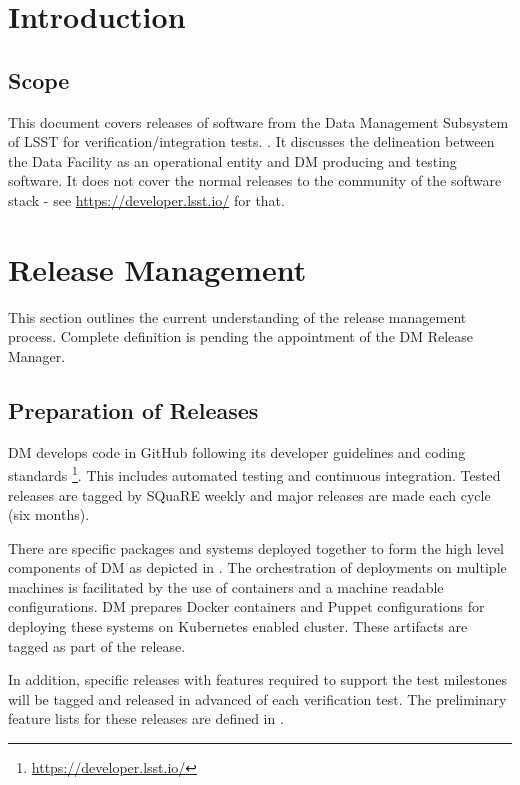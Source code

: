 \section{Introduction}
\subsection{Scope}

This document covers releases of software from the Data Management Subsystem of LSST for verification/integration tests. .
It discusses the delineation between the Data Facility as an operational entity and DM producing and testing software.
It does not cover the normal releases to the community of the software stack - see \url{https://developer.lsst.io/} for that.

\section{Release Management}\label{sect:relman}

This section outlines the current understanding of the release management process.
Complete definition is pending the appointment of the DM Release Manager.

\subsection{Preparation of Releases}\label{sect:relprep}

DM develops code in GitHub following its developer guidelines and coding standards \footnote{\url{https://developer.lsst.io/}}.
This includes automated testing and continuous integration.
Tested releases are tagged by SQuaRE weekly and major releases are made each cycle (six months).

There are specific packages and systems deployed together to form the high level components of DM as depicted in .
The orchestration of deployments on multiple machines is facilitated by the use of containers and a machine readable configurations.
DM prepares Docker containers and Puppet configurations for deploying these systems on Kubernetes enabled cluster.
These artifacts are tagged as part of the release.

In addition, specific releases with features required to support the  test milestones will be tagged and released in advanced of each verification test.
The preliminary feature lists for these releases are defined in .

